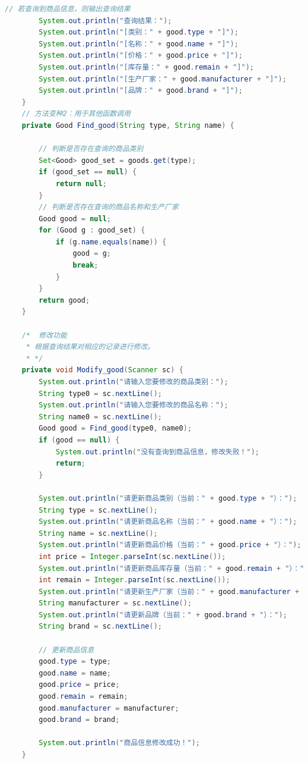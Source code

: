 \documentclass[12pt, a4paper, oneside]{ctexart}
\begin{document}
\begin{lstlisting}[language=Java, breaklines=true]
        // 若查询到商品信息，则输出查询结果
        System.out.println("查询结果：");
        System.out.println("[类别：" + good.type + "]");
        System.out.println("[名称：" + good.name + "]");
        System.out.println("[价格：" + good.price + "]");
        System.out.println("[库存量：" + good.remain + "]");
        System.out.println("[生产厂家：" + good.manufacturer + "]");
        System.out.println("[品牌：" + good.brand + "]");
    }
    // 方法变种2：用于其他函数调用
    private Good Find_good(String type, String name) {

        // 判断是否存在查询的商品类别
        Set<Good> good_set = goods.get(type);
        if (good_set == null) {
            return null;
        }
        // 判断是否存在查询的商品名称和生产厂家
        Good good = null;
        for (Good g : good_set) {
            if (g.name.equals(name)) {
                good = g;
                break;
            }
        }
        return good;
    }

    /*  修改功能
     * 根据查询结果对相应的记录进行修改。
     * */
    private void Modify_good(Scanner sc) {
        System.out.println("请输入您要修改的商品类别：");
        String type0 = sc.nextLine();
        System.out.println("请输入您要修改的商品名称：");
        String name0 = sc.nextLine();
        Good good = Find_good(type0, name0);
        if (good == null) {
            System.out.println("没有查询到商品信息，修改失败！");
            return;
        }

        System.out.println("请更新商品类别（当前：" + good.type + "）：");
        String type = sc.nextLine();
        System.out.println("请更新商品名称（当前：" + good.name + "）：");
        String name = sc.nextLine();
        System.out.println("请更新商品价格（当前：" + good.price + "）：");
        int price = Integer.parseInt(sc.nextLine());
        System.out.println("请更新商品库存量（当前：" + good.remain + "）：");
        int remain = Integer.parseInt(sc.nextLine());
        System.out.println("请更新生产厂家（当前：" + good.manufacturer + "）：");
        String manufacturer = sc.nextLine();
        System.out.println("请更新品牌（当前：" + good.brand + "）：");
        String brand = sc.nextLine();

        // 更新商品信息
        good.type = type;
        good.name = name;
        good.price = price;
        good.remain = remain;
        good.manufacturer = manufacturer;
        good.brand = brand;

        System.out.println("商品信息修改成功！");
    }


\end{lstlisting}
\end{document}
